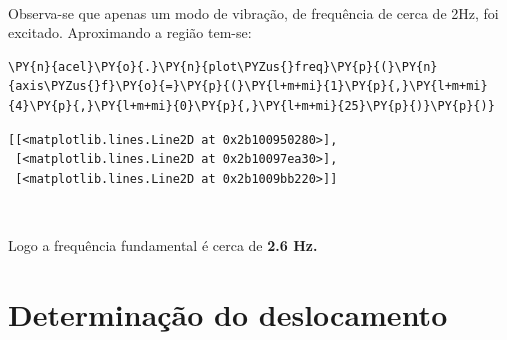     \begin{center}
    \end{center}
    { \hspace*{\fill} \\}
    
    Observa-se que apenas um modo de vibração, de frequência de cerca de
2Hz, foi excitado. Aproximando a região tem-se:

    \begin{tcolorbox}[breakable, size=fbox, boxrule=1pt, pad at break*=1mm,colback=cellbackground, colframe=cellborder]
\begin{Verbatim}[commandchars=\\\{\}]
\PY{n}{acel}\PY{o}{.}\PY{n}{plot\PYZus{}freq}\PY{p}{(}\PY{n}{axis\PYZus{}f}\PY{o}{=}\PY{p}{(}\PY{l+m+mi}{1}\PY{p}{,}\PY{l+m+mi}{4}\PY{p}{,}\PY{l+m+mi}{0}\PY{p}{,}\PY{l+m+mi}{25}\PY{p}{)}\PY{p}{)}
\end{Verbatim}
\end{tcolorbox}

            \begin{tcolorbox}[breakable, size=fbox, boxrule=.5pt, pad at break*=1mm, opacityfill=0]
\begin{Verbatim}[commandchars=\\\{\}]
[[<matplotlib.lines.Line2D at 0x2b100950280>],
 [<matplotlib.lines.Line2D at 0x2b10097ea30>],
 [<matplotlib.lines.Line2D at 0x2b1009bb220>]]
\end{Verbatim}
\end{tcolorbox}
        
    \begin{center}
    \end{center}
    { \hspace*{\fill} \\}
    
    Logo a frequência fundamental é cerca de \textbf{2.6 Hz. }

    \hypertarget{determinauxe7uxe3o-do-deslocamento}{%
\section{Determinação do
deslocamento}\label{determinauxe7uxe3o-do-deslocamento}}

